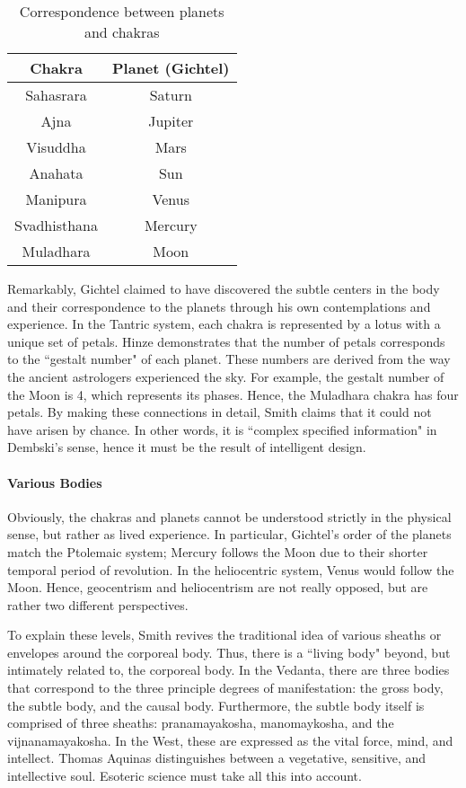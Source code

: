 \begin{table}[h]\centering\small
\begin{tabular}{cc}\toprule
Chakra &
Planet (Gichtel) \\\toprule
Sahasrara &
Saturn\\\midrule
Ajna &
Jupiter\\\midrule
Visuddha &
Mars\\\midrule
Anahata &
Sun\\\midrule
Manipura &
Venus\\\midrule
Svadhisthana &
Mercury\\\midrule
Muladhara &
Moon\\\bottomrule
\end{tabular}
\caption{Correspondence between planets and chakras}
\label{fig:chackrasGichtel}
\end{table}
Remarkably, Gichtel claimed to have discovered the subtle centers in the body and their correspondence to the planets through his own contemplations and experience. In the Tantric system, each chakra is represented by a lotus with a unique set of petals. Hinze demonstrates that the number of petals corresponds to the ``gestalt number" of each planet. These numbers are derived from the way the ancient astrologers experienced the sky. For example, the gestalt number of the Moon is 4, which represents its phases. Hence, the Muladhara chakra has four petals. By making these connections in detail, Smith claims that it could not have arisen by chance. In other words, it is ``complex specified information" in Dembski's sense, hence it must be the result of intelligent design.

\paragraph{Various Bodies}
Obviously, the chakras and planets cannot be understood strictly in the physical sense, but rather as lived experience. In particular, Gichtel's order of the planets match the Ptolemaic system; Mercury follows the Moon due to their shorter temporal period of revolution. In the heliocentric system, Venus would follow the Moon. Hence, geocentrism and heliocentrism are not really opposed, but are rather two different perspectives.

To explain these levels, Smith revives the traditional idea of various sheaths or envelopes around the corporeal body. Thus, there is a ``living body" beyond, but intimately related to, the corporeal body. In the Vedanta, there are three bodies that correspond to the three principle degrees of manifestation: the gross body, the subtle body, and the causal body. Furthermore, the subtle body itself is comprised of three sheaths: pranamayakosha, manomaykosha, and the vijnanamayakosha. In the West, these are expressed as the vital force, mind, and intellect. Thomas Aquinas distinguishes between a vegetative, sensitive, and intellective soul. Esoteric science must take all this into account.

